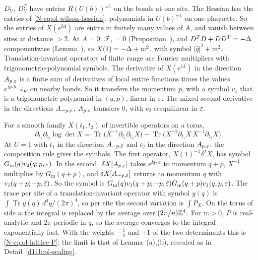\begin{step}
$D_U$, $D_U^T$ have entries $R(U(b))^{\pm1}$ on the bonds at one site. The Hessian has the entries of \eqref{N-eq:ol-wilson-hessian}, polynomials in $U(b)^{\pm1}$ on one plaquette. So the entries of $X(e^{\ii A})$ are entire in finitely many values of $A$, and vanish between sites at distance $>2$. At $A=0$: $\mathcal F_1=0$ (Proposition~), and $D^TD+DD^T=-\Delta$ componentwise (Lemma~), so $X(1)=-\Delta+\mathrm m^2$, with symbol $|\hat q|^2+\mathrm m^2$. Translation-invariant operators of finite range are Fourier multipliers with trigonometric-polynomial symbols. The derivative of $X(e^{\ii A})$ in the direction $A_{p,\varepsilon}$ is a finite sum of derivatives of local entire functions times the values $e^{\mathrm i p\cdot b_-}\varepsilon_\mu$ on nearby bonds. So it transfers the momentum $p$, with a symbol $v_1$ that is a trigonometric polynomial in $(q,p)$, linear in $\varepsilon$. The mixed second derivative in the directions $A_{-p,\bar{\varepsilon}}$, $A_{p,\varepsilon}$ transfers $0$, with $v_2$ sesquilinear in $\varepsilon$.
\end{step}

\begin{step}
For a smooth family $X(t_1,t_2)$ of invertible operators on a torus,
\[
\partial_{t_1}\partial_{t_2}\log\det X=\operatorname{Tr}\big(X^{-1}\partial_{t_1}\partial_{t_2}X\big)-\operatorname{Tr}\big(X^{-1}\partial_{t_1}X\,X^{-1}\partial_{t_2}X\big).
\]
At $U=1$ with $t_1$ in the direction $A_{-p,\bar{\varepsilon}}$ and $t_2$ in the direction $A_{p,\varepsilon}$, the composition rule gives the symbols. The first operator, $X(1)^{-1}\delta^2X$, has symbol $G_{\mathrm m}(q)v_2(q;p,\varepsilon)$. In the second, $\delta X[A_{p,\varepsilon}]$ takes $e^{\ii q\cdot x}$ to momentum $q+p$, $X^{-1}$ multiplies by $G_{\mathrm m}(q+p)$, and $\delta X[A_{-p,\bar{\varepsilon}}]$ returns to momentum $q$ with $v_1(q+p;-p,\bar{\varepsilon})$. So the symbol is $G_{\mathrm m}(q)v_1(q+p;-p,\bar{\varepsilon})G_{\mathrm m}(q+p)v_1(q;p,\varepsilon)$. The trace per site of a translation-invariant operator with symbol $y(q)$ is $\int\operatorname{Tr}y(q)\,d^4q/(2\pi)^4$, so per site the second variation is $\int P_X$. On the torus of side $n$ the integral is replaced by the average over $(2\pi/n)\mathbb Z^4$. For $\mathrm m>0$, $P$ is real-analytic and $2\pi$-periodic in $q$, so the average converges to the integral exponentially fast. With the weights $-\frac12$ and $+1$ of the two determinants this is \eqref{N-eq:ol-lattice-P}; the limit is that of Lemma~(a),(b), rescaled as in Detail~\ref{d11b:ol-scaling}.
\end{step}

